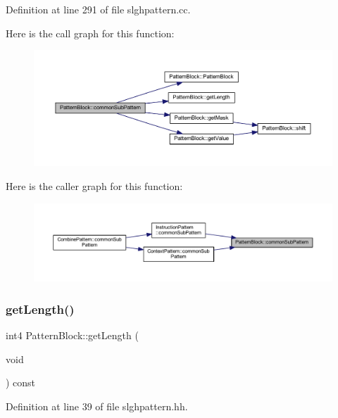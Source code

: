 Definition at line 291 of file slghpattern.\+cc.

Here is the call graph for this function\+:
\nopagebreak
\begin{figure}[H]
\begin{center}
\leavevmode
\includegraphics[width=350pt]{class_pattern_block_ae48d46851ac35befe0124e01966c377a_cgraph}
\end{center}
\end{figure}
Here is the caller graph for this function\+:
\nopagebreak
\begin{figure}[H]
\begin{center}
\leavevmode
\includegraphics[width=350pt]{class_pattern_block_ae48d46851ac35befe0124e01966c377a_icgraph}
\end{center}
\end{figure}
\mbox{\label{class_pattern_block_acf2619fb7613d032fc3ff61a9e84c0d5}} 
\subsubsection{\texorpdfstring{getLength()}{getLength()}}
{\footnotesize\ttfamily int4 Pattern\+Block\+::get\+Length (\begin{DoxyParamCaption}\item[{void}]{ }\end{DoxyParamCaption}) const\hspace{0.3cm}{\ttfamily [inline]}}



Definition at line 39 of file slghpattern.\+hh.

